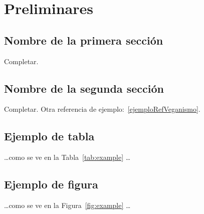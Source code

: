 \chapter{Preliminares}\label{chapter02}

\section{Nombre de la primera sección}

Completar.

\section{Nombre de la segunda sección}

Completar. Otra referencia de ejemplo:~\ref{ejemploRefVeganismo}.

\section{Ejemplo de tabla}



\noindent \ldots como se ve en la Tabla~\ref{tab:example} \ldots

\section{Ejemplo de figura}



\noindent \ldots como se ve en la Figura~\ref{fig:example} \ldots
